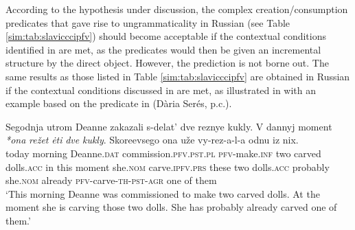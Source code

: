\documentclass[output=paper,colorlinks,citecolor=brown]{langscibook}
\begin{document}
\noindent According to the hypothesis under discussion, the complex creation/con\-sump\-tion predicates that gave rise to ungrammaticality in Russian (see Table \ref{sim:tab:slavicccipfv}) %
should become acceptable if the contextual conditions identified in \citet{big:Mehlig2012} are met, as the predicates would then be given an incremental structure by the direct object. However, the prediction is not borne out. The same results as those listed in Table \ref{sim:tab:slavicccipfv} are obtained in Russian if the contextual conditions discussed in \citet{big:Mehlig2012} are met, %
as illustrated in  with an example based on the predicate in  (Dària Serés, p.c.).

\ea \label{askDaria} \gll Segodnja utrom Deanne zakazali s-delat’ dve reznye kukly. V dannyj  moment \textit{*}\textit{ona} \textit{režet} \textit{{\.e}ti} \textit{dve} \textit{kukly}. Skoree\hspace{3pt}vsego ona uže vy-rez-a-l-a odnu iz nix. \\
today morning Deanne.\textsc{dat} commission.\textsc{pfv}.\textsc{pst}.\textsc{pl} 
\textsc{pfv}-make.\textsc{inf} two carved dolls.\textsc{acc} 
in this moment \hspace{5pt}she.\textsc{nom} carve.\textsc{ipfv}.\textsc{prs} these two dolls.\textsc{acc} probably she.\textsc{nom} already \textsc{pfv}-carve-\textsc{th}-\textsc{pst}-\textsc{agr} one of them \\
\glt `This morning Deanne was commissioned to make two carved dolls. At the moment she is carving those two dolls. She has probably already carved one of them.' \z

\end{document}
